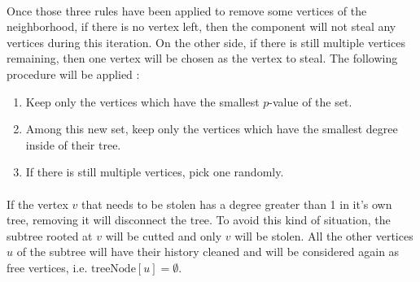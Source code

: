 \paragraph{}
Once those three rules have been applied to remove some vertices of the
neighborhood, if there is no vertex left, then the component will not steal
any vertices during this iteration. On the other side, if there is still
multiple vertices remaining, then one vertex will be chosen as the vertex to
steal. The following procedure will be applied :
\begin{enumerate}
\item Keep only the vertices which have the smallest $p$-value of the set.
\item Among this new set, keep only the vertices which have the smallest
  degree inside of their tree.
\item If there is still multiple vertices, pick one randomly.
\end{enumerate}

\paragraph{\label{cutoff-subtrees}}
If the vertex $v$ that needs to be stolen has a degree greater than 1 in
it's own tree, removing it will disconnect the tree. To avoid this kind of
situation, the subtree rooted at $v$ will be cutted and only $v$ will be
stolen. All the other vertices $u$ of the subtree will have their history
cleaned and will be considered again as free vertices, i.e.
$\mathrm{treeNode}[u] = \emptyset$.